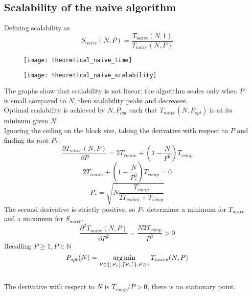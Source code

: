 \documentclass[a4paper, 11pt]{article}
\DeclareMathOperator*{\argmin}{arg\,min}
\DeclarePairedDelimiter{\ceil}{\lceil}{\rceil}
\DeclarePairedDelimiter{\floor}{\lfloor}{\rfloor}
\begin{document}
\subsection{Scalability of the naive algorithm}
Defining scalability as
$$S_{naive}(N, P) = \frac{T_{naive}(N, 1)}{T_{naive}(N, P)}$$
\FloatBarrier
\begin{figure}
\centering
\begin{minipage}{.5\textwidth}
  \centering
  \texttt{[image: theoretical\_naive\_time]}
  \label{fig:theoretical_naive_time}
\end{minipage}%
\begin{minipage}{.5\textwidth}
  \centering
  \texttt{[image: theoretical\_naive\_scalability]}
  \label{fig:theoretical_naive_scalability}
\end{minipage}
\end{figure}
\FloatBarrier
The graphs show that scalability is not linear; the algorithm scales only when $P$ is small compared to $N$, then scalability peaks and decreases.\\
Optimal scalability is achieved by $N, P_{opt}$ such that $T_{naive}(N, P_{opt})$ is at its mininum given $N$.\\
Ignoring the ceiling on the block size, taking the derivative with respect to $P$ and finding its root $P_{*}$:
$$\frac{\partial T_{naive}(N, P)}{\partial P} = 2T_{comm} + \left(1-\frac{N}{P^{2}}\right)T_{comp}$$
$$2T_{comm} + \left(1-\frac{N}{P_{*}^{2}}\right)T_{comp} = 0$$
$$P_{*} = \sqrt{N\frac{T_{comp}}{2T_{comm} + T_{comp}}}$$
The second derivative is strictly positive, so $P_{*}$ determines a minimum for $T_{naive}$ and a maximum for $S_{naive}$.
$$\frac{\partial^{2} T_{naive}(N, P)}{\partial P^{2}} = \frac{N2T_{comp}}{P^{3}} > 0$$
Recalling $P \geq 1, P \in \mathbb{N}$
$$P_{opt}(N) = \argmin_{P \in \{ \floor{P_{*}}, \ceil{P_{*}} \}, P \geq 1 }{T_{naive}(N, P)} $$\\
The derivative with respect to $N$ is $T_{comp}/P > 0$, there is no stationary point.\\
\end{document}
